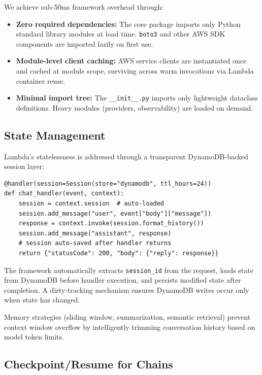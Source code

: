 \documentclass[10pt,twocolumn,letterpaper]{article}
\begin{document}
We achieve sub-50ms framework overhead through:

\begin{itemize}[leftmargin=*,itemsep=2pt,topsep=2pt]
    \item \textbf{Zero required dependencies:} The core package imports only Python standard library modules at load time. \texttt{boto3} and other AWS SDK components are imported lazily on first use.
    \item \textbf{Module-level client caching:} AWS service clients are instantiated once and cached at module scope, surviving across warm invocations via Lambda container reuse.
    \item \textbf{Minimal import tree:} The \texttt{\_\_init\_\_.py} imports only lightweight dataclass definitions. Heavy modules (providers, observability) are loaded on demand.
\end{itemize}

\subsection{State Management}

Lambda's statelessness is addressed through a transparent DynamoDB-backed session layer:

\begin{lstlisting}
@handler(session=Session(store="dynamodb", ttl_hours=24))
def chat_handler(event, context):
    session = context.session  # auto-loaded
    session.add_message("user", event["body"]["message"])
    response = context.invoke(session.format_history())
    session.add_message("assistant", response)
    # session auto-saved after handler returns
    return {"statusCode": 200, "body": {"reply": response}}
\end{lstlisting}

The framework automatically extracts \texttt{session\_id} from the request, loads state from DynamoDB before handler execution, and persists modified state after completion. A dirty-tracking mechanism ensures DynamoDB writes occur only when state has changed.

Memory strategies (sliding window, summarization, semantic retrieval) prevent context window overflow by intelligently trimming conversation history based on model token limits.

\subsection{Checkpoint/Resume for Chains}
\end{document}
